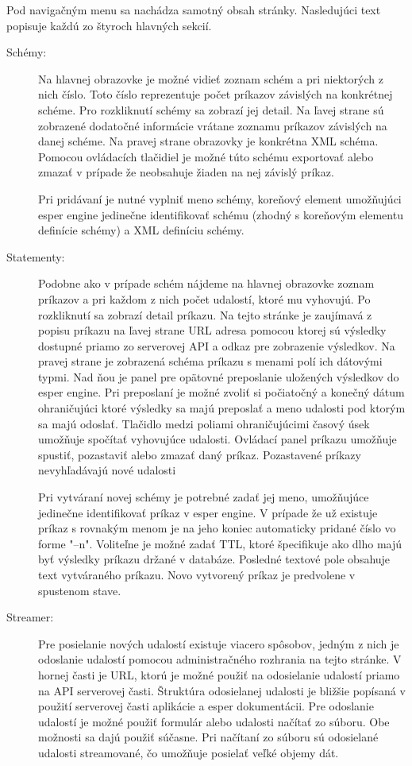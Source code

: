 	
	Pod navigačným menu sa nachádza samotný obsah stránky. Nasledujúci text popisuje každú zo štyroch hlavných sekcií.
	\begin{description}
		\item[Schémy:] Na hlavnej obrazovke je možné vidieť zoznam schém a pri niektorých z nich číslo. Toto číslo reprezentuje počet príkazov závislých na konkrétnej schéme. Pro rozkliknutí schémy sa zobrazí jej detail. Na ľavej strane sú zobrazené dodatočné informácie vrátane zoznamu príkazov závislých na danej schéme. Na pravej strane obrazovky je konkrétna XML schéma. Pomocou ovládacích tlačidiel je možné túto schému exportovať alebo zmazať v prípade že neobsahuje žiaden na nej závislý príkaz.

		Pri pridávaní je nutné vyplniť meno schémy, koreňový element umožňujúci esper engine jedinečne identifikovať schému (zhodný s koreňovým elementu definície schémy) a XML definíciu schémy.

		\item[Statementy:] Podobne ako v prípade schém nájdeme na hlavnej obrazovke zoznam príkazov a pri každom z nich počet udalostí, ktoré mu vyhovujú. Po rozkliknutí sa zobrazí detail príkazu. Na tejto stránke je zaujímavá z popisu príkazu na ľavej strane URL adresa pomocou ktorej sú výsledky dostupné priamo zo serverovej API a odkaz pre zobrazenie výsledkov.
		Na pravej strane je zobrazená schéma príkazu s menami polí ich dátovými typmi. Nad ňou je panel pre opätovné preposlanie uložených výsledkov do esper engine. Pri preposlaní je možné zvoliť si počiatočný a konečný dátum ohraničujúci ktoré výsledky sa majú preposlať a meno udalosti pod ktorým sa majú odoslať. Tlačidlo medzi poliami ohraničujúcimi časový úsek umožňuje spočítať vyhovujúce udalosti.
		Ovládací panel príkazu umožňuje spustiť, pozastaviť alebo zmazať daný príkaz. Pozastavené príkazy nevyhľadávajú nové udalosti
		
		Pri vytváraní novej schémy je potrebné zadať jej meno, umožňujúce jedinečne identifikovať príkaz v esper engine. V prípade že už existuje príkaz s rovnakým menom je na jeho koniec automaticky pridané číslo vo forme "--n". Voliteľne je možné zadať TTL, ktoré špecifikuje ako dlho majú byť výsledky príkazu držané v databáze. Posledné textové pole obsahuje text vytváraného príkazu. Novo vytvorený príkaz je predvolene v spustenom stave.
		
		\item[Streamer:] Pre posielanie nových udalostí existuje viacero spôsobov, jedným z nich je odoslanie udalostí pomocou administračného rozhrania na tejto stránke. V hornej časti je URL, ktorú je možné použiť na odosielanie udalostí priamo na API serverovej časti. Štruktúra odosielanej udalosti je bližšie popísaná v použití serverovej časti aplikácie a esper dokumentácii.
		Pre odoslanie udalostí je možné použiť formulár alebo udalosti načítať zo súboru. Obe možnosti sa dajú použiť súčasne. Pri načítaní zo súboru sú odosielané udalosti streamované, čo umožňuje posielať veľké objemy dát.


\end{description}
